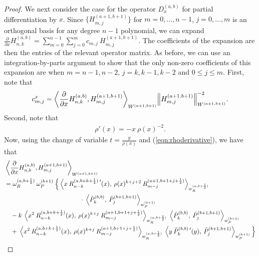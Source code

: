 \documentclass[11pt, oneside]{article}   	%
\newcommand{\half}{\frac{1}{2}}
\newcommand{\pddx}{\frac{\partial}{\partial x}}
\newcommand{\hdop}{H}
\newcommand{\hdopnkab}{\hdop_{n,k}^{(a,b)}}
\newcommand{\jac}{{\tilde P}}
\newcommand{\genjac}{R}
\newcommand{\genjacnmk}{\genjac_{n-k}}
\newcommand{\genjacmmj}{\genjac_{m-j}}
\newcommand{\genjacw}{w_\genjac}
\newcommand{\jacw}{w_P}
\newcommand{\normgenjac}{\omega_\genjac}
\newcommand{\normjac}{\omega_P}
\begin{document}
\begin{proof}
We next consider the case for the operator $D_x^{(a,b)}$ for partial differentiation by $x$. Since $\{\hdop^{(a+1, b+1)}_{m,j}\}$ for $m = 0,\dots,n-1$, $j = 0,\dots,m$ is an orthogonal basis for any degree $n-1$ polynomial, we can expand $\pddx \hdopnkab = \sum_{m=0}^{n-1} \sum_{j=0}^m c_{m,j} \: \hdop^{(a+1, b+1)}_{m,j}$. The coefficients of the expansion are then the entries of the relevant operator matrix. As before, we can use an integration-by-parts argument to show that the only non-zero coefficients of this expansion are when $m = n-1, n-2$, $j = k, k-1, k-2$ and $0 \le j \le m$. First, note that
\begin{align*}
	c_{m,j}^x = {\ip<\pddx \hdopnkab, \hdop^{(a+1, b+1)}_{m,j} >_{W^{(a+1, b+1)}}}{\norm{\hdop^{(a+1, b+1)}_{m,j}}^{-2}_{W^{(a+1, b+1)}}}.
\end{align*}
Second, note that
\begin{align}
	\rho'(x) = -x \: \rho(x)^{-2}. \label{eqn:rhoderivative}
\end{align}
Now, using the change of variable $t= \frac{y}{\rho(x)}$ and (\ref{eqn:rhoderivative}), we have that
\begin{align*}
	&\ip<\pddx \hdopnkab, \hdop^{(a+1, b+1)}_{m,j} >_{W^{(a+1, b+1)}} \nonumber \\ 
	&= \normgenjac^{(a, b+\half)} \: \normjac^{(b+1)} \: \Big\{ \ip< x \: \genjacnmk^{(a, b+k+\half) \: \prime} (x), \: \rho(x)^{k+j+2} \: \genjacmmj^{(a+1, b+1+j+\half)} >_{\genjacw^{(a, b+\half)}} \\ 
	&\quad \quad \quad \quad \quad \quad \quad \quad \quad \quad \quad \quad \cdot \: \ip< \jac_k^{(b,b)}, \: \jac_j^{(b+1,b+1)} >_{\jacw^{(b+1)}}  \nonumber \\ 
	& \quad - k \: \ip< x^2 \: \genjacnmk^{(a, b+k+\half)}(x), \: \rho(x)^{k+j} \: \genjacmmj^{(a+1, b+1+j+\half)} >_{\genjacw^{(a, b+\half)}} 
		\: \ip< \jac_k^{(b,b)}, \: \jac_j^{(b+1,b+1)} >_{\jacw^{(b+1)}}  \nonumber \\ 
	& \quad + \: \ip< x^2 \: \genjacnmk^{(a, b+k+\half)}(x), \: \rho(x)^{k+j} \: \genjacmmj^{(a+1, b+1+j+\half)} >_{\genjacw^{(a, b+\half)}} 
		\: \ip< y \: \jac_k^{(b,b) \: \prime} (y), \: \jac_j^{(b+1,b+1)} >_{\jacw^{(b+1)}} \Big\}
\end{align*}


\end{proof}
\end{document}
